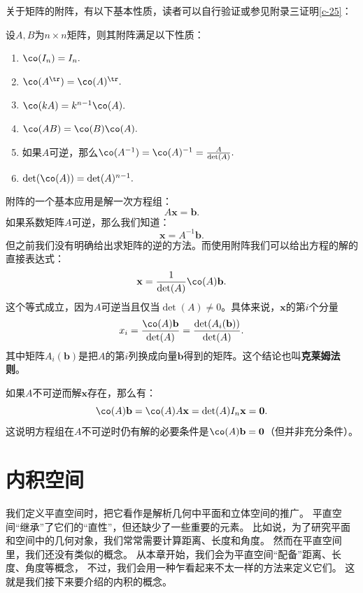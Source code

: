 \documentclass[12pt,UTF8,fontset=none]{ctexbook}
\begin{document}
关于矩阵的附阵，有以下基本性质，读者可以自行验证或参见附录三证明\ref{c-25}：
\begin{pp}\label{pp:10_50}
    设$A,B$为$n\times n$矩阵，则其附阵满足以下性质：
    \begin{enumerate}
    \item $\co(I_n) = I_n.$
    \item $\co(A^{\tr}) = \co(A)^{\tr}.$
    \item $\co(kA) = k^{n-1}\co(A).$
    \item $\co(AB) = \co(B)\co(A). $
    \item 如果$A$可逆，那么$\co(A^{-1}) = \co(A)^{-1} = \frac{A}{\det(A)}.$
    \item $\det(\co(A)) = \det(A)^{n-1}.$
\end{enumerate}
\end{pp}

附阵的一个基本应用是解一次方程组：
$$ A\mathbf{x} = \mathbf{b}.$$
如果系数矩阵$A$可逆，那么我们知道：
$$ \mathbf{x} = A^{-1}\mathbf{b}.$$
但之前我们没有明确给出求矩阵的逆的方法。而使用附阵我们可以给出方程的解的直接表达式：
$$
    \mathbf{x} =  \frac{1}{\det(A)}\co(A)\mathbf{b}.
$$
这个等式成立，因为$A$可逆当且仅当$\det(A)\neq 0$。具体来说，$\mathbf{x}$的第$i$个分量
$$
x_i = \frac{\co(A)\mathbf{b}}{\det(A)} = \frac{\det(A_i(\mathbf{b}))}{\det(A)}. 
$$
其中矩阵$A_i(\mathbf{b})$是把$A$的第$i$列换成向量$\mathbf{b}$得到的矩阵。这个结论也叫\textbf{克莱姆法则}。

如果$A$不可逆而解$\mathbf{x}$存在，那么有：
$$
\co(A)\mathbf{b} = \co(A)A\mathbf{x} = \det(A)I_n\mathbf{x} = \mathbf{0}.
$$
这说明方程组在$A$不可逆时仍有解的必要条件是$\co(A)\mathbf{b} =\mathbf{0}$（但并非充分条件）。


\chapter{内积空间}
我们定义平直空间时，把它看作是解析几何中平面和立体空间的推广。
平直空间“继承”了它们的“直性”，但还缺少了一些重要的元素。
比如说，为了研究平面和空间中的几何对象，我们常常需要计算距离、长度和角度。
然而在平直空间里，我们还没有类似的概念。
从本章开始，我们会为平直空间“配备”距离、长度、角度等概念，
不过，我们会用一种乍看起来不太一样的方法来定义它们。
这就是我们接下来要介绍的内积的概念。

\begin{center}
\end{center}
\end{document}
